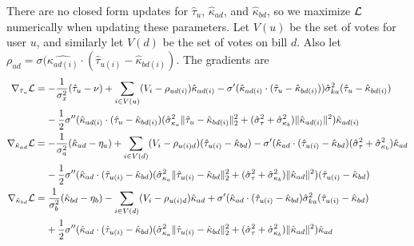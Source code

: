 \documentclass{article}
\begin{document}
 There are no closed form updates for $\hat{\tau}_u$, $\hat{\kappa}_{ad}$, and $\hat{\kappa}_{bd}$, so we maximize $\mathcal{L}$ numerically when updating these parameters. Let $V(u)$ be the set of votes for user $u$, and similarly let $V(d)$ be the set of votes on bill $d$. Also let $\rho_{ud} = \sigma(\hat{\kappa_{ad(i)}} \cdot (\hat{\tau}_{u(i)} - \hat{\kappa}_{bd(i)})$. The gradients are
\begin{align*}
\nabla_{\hat{\tau}_u} \mathcal{L} 
& = -\frac{1}{\sigma^2_x}(\hat{\tau}_u - \nu) + \sum_{i \in V(u)}(V_i - \rho_{ud(i)})\hat{\kappa}_{ad(i)}
- \sigma'(\hat{\kappa}_{ad(i)} \cdot (\hat{\tau}_{u} - \hat{\kappa}_{bd(i)}))\hat{\sigma}^2_{ka}(\hat{\tau}_u - \hat{\kappa}_{bd(i)}) \\
& \;\;\;\; - \frac{1}{2} \sigma''(\hat{\kappa}_{ad(i)} \cdot (\hat{\tau}_{u} - \hat{\kappa}_{bd(i)})(\hat{\sigma}^2_{\kappa_a} \|\hat{\tau}_{u} - \hat{\kappa}_{bd(i)}\|_2^2 + (\hat{\sigma}^2_{\tau} + \hat{\sigma}^2_{\kappa_b})\|\hat{\kappa}_{ad(i)}\|^2)\hat{\kappa}_{ad(i)}\\
\nabla_{\hat{\kappa}_{ad}} \mathcal{L} 
& = -\frac{1}{\sigma^2_a}(\hat{\kappa}_{ad} - \eta_a) + \sum_{i \in V(d)}(V_i - \rho_{u(i)d})(\hat{\tau}_{u(i)} - \hat{\kappa}_{bd})
- \sigma'(\hat{\kappa}_{ad} \cdot (\hat{\tau}_{u(i)} - \hat{\kappa}_{bd})(\hat{\sigma}^2_{\tau} + \hat{\sigma}^2_{\kappa_b})\hat{\kappa}_{ad}\\
& \;\;\;\; - \frac{1}{2} \sigma''(\hat{\kappa}_{ad} \cdot (\hat{\tau}_{u(i)} - \hat{\kappa}_{bd})(\hat{\sigma}^2_{\kappa_a} \|\hat{\tau}_{u(i)} - \hat{\kappa}_{bd}\|_2^2 + (\hat{\sigma}^2_{\tau} + \hat{\sigma}^2_{\kappa_b})\|\hat{\kappa}_{ad}\|^2)(\hat{\tau}_{u(i)} - \hat{\kappa}_{bd})\\
\nabla_{\hat{\kappa}_{bd}} \mathcal{L} 
& = \frac{1}{\sigma^2_b}(\hat{\kappa}_{bd} - \eta_b) - \sum_{i \in V(d)}(V_i - \rho_{u(i)d})\hat{\kappa}_{ad}
+ \sigma'(\hat{\kappa}_{ad} \cdot (\hat{\tau}_{u(i)} - \hat{\kappa}_{bd})\hat{\sigma}^2_{ka}(\hat{\tau}_{u(i)} - \hat{\kappa}_{bd})\\
& \;\;\;\; + \frac{1}{2} \sigma''(\hat{\kappa}_{ad} \cdot (\hat{\tau}_{u(i)} - \hat{\kappa}_{bd})(\hat{\sigma}^2_{\kappa_a} \|\hat{\tau}_{u(i)} - \hat{\kappa}_{bd}\|_2^2 + (\hat{\sigma}^2_{\tau} + \hat{\sigma}^2_{\kappa_b})\|\hat{\kappa}_{ad}\|^2)\hat{\kappa}_{ad}
\end{align*}
\end{document}
